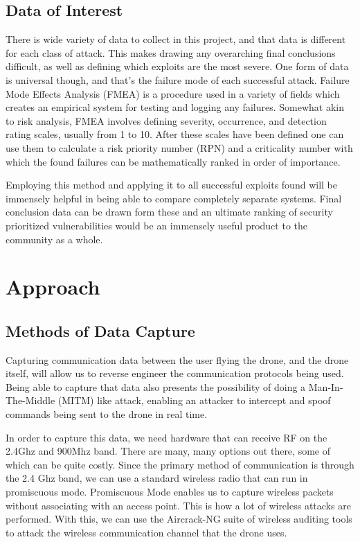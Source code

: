 \documentclass[IEEEtran,letterpaper,10pt,notitlepage,draftclsnofoot,onecolumn]{article}
\begin{document}
\subsection{Data of Interest}
There is wide variety of data to collect in this project, and that data is different for each class of attack.
This makes drawing any overarching final conclusions difficult, as well as defining which exploits are the most severe.
One form of data is universal though, and that's the failure mode of each successful attack.
Failure Mode Effects Analysis (FMEA) is a procedure used in a variety of fields which creates an empirical system for testing and logging any failures.
Somewhat akin to risk analysis, FMEA involves defining severity, occurrence, and detection rating scales, usually from 1 to 10.
After these scales have been defined one can use them to calculate a risk priority number (RPN) and a criticality number with which the found failures can be mathematically ranked in order of importance. \cite{FMEA}

Employing this method and applying it to all successful exploits found will be immensely helpful in being able to compare completely separate systems.
Final conclusion data can be drawn form these and an ultimate ranking of security prioritized vulnerabilities would be an immensely useful product to the community as a whole. 

\section{Approach}
\subsection{Methods of Data Capture}
Capturing communication data between the user flying the drone, and the drone itself, will allow us to reverse engineer
the communication protocols being used. Being able to capture that data also presents the possibility of doing a
Man-In-The-Middle (MITM) like attack, enabling an attacker to intercept and spoof commands being sent to the drone
in real time.

In order to capture this data, we need hardware that can receive RF on the 2.4Ghz and 900Mhz band. There are many, many
options out there, some of which can be quite costly. Since the primary method of communication is through the 2.4 Ghz
band, we can use a standard wireless radio that can run in promiscuous mode\cite{WiFiPerc}. Promiscuous Mode enables
us to capture wireless packets without associating with an access point. This is how a lot of wireless attacks are
performed\cite{WiFiPerc}. With this, we can use the Aircrack-NG suite of wireless auditing tools to attack the wireless
communication channel that the drone uses\cite{AircrackNG}.
\end{document}
